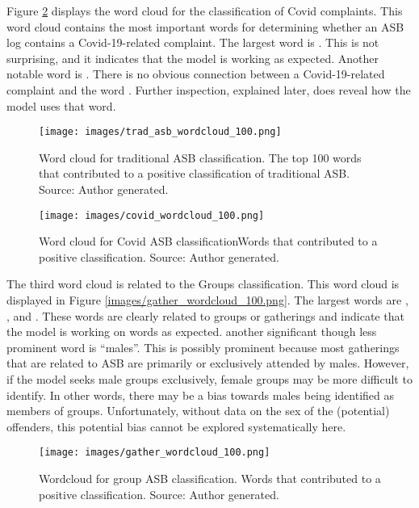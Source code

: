 Figure \ref{fig: wordcloud_covid} displays the word cloud for the classification of Covid complaints. This word cloud contains the most important words for determining whether an ASB log contains a Covid-19-related complaint. The largest word is . This is not surprising, and it indicates that the model is working as expected. Another notable word is . There is no obvious connection between a Covid-19-related complaint and the word . Further inspection, explained later, does reveal how the model uses that word.

\begin{figure}[h]
    \texttt{[image: images/trad\_asb\_wordcloud\_100.png]}
    \caption[Word cloud for traditional ASB classification.]{{Word cloud for traditional ASB classification.} The top 100 words that contributed to a positive classification of traditional ASB. Source: Author generated.}
    \label{fig: wordcloud_trad}
\end{figure}



\begin{figure}[h]
    \centering
    \texttt{[image: images/covid\_wordcloud\_100.png]}
    \caption[Word cloud for Covid ASB classification]{{Word cloud for Covid ASB classification}Words that contributed to a positive classification. Source: Author generated.}
    \label{fig: wordcloud_covid}
\end{figure}

The third word cloud is related to the Groups classification. This word cloud is displayed in Figure \ref{images/gather_wordcloud_100.png}. The largest words are , , and . These words are clearly related to groups or gatherings and indicate that the model is working on words as expected. another significant though less prominent word is “males”. This is possibly prominent because most gatherings that are related to ASB are primarily or exclusively attended by males. However, if the model seeks male groups exclusively, female groups may be more difficult to identify. In other words, there may be a bias towards males being identified as members of groups. Unfortunately, without data on the sex of the (potential) offenders, this potential bias cannot be explored systematically here.

\begin{figure}[h]
    \texttt{[image: images/gather\_wordcloud\_100.png]}
    \caption[Wordcloud for group ASB classification.]{{Wordcloud for group ASB classification.} Words that contributed to a positive classification. Source: Author generated.}
    \label{fig: wordcloud_gather}
\end{figure}
   



